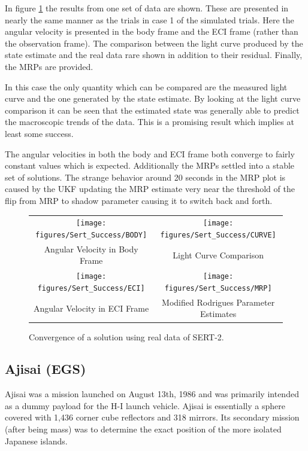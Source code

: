 In figure \ref{sert-2_results} the results from one set of data are shown. These are presented in nearly the same manner as the trials in case 1 of the simulated trials. Here the angular velocity is presented in the body frame and the ECI frame (rather than the observation frame). The comparison between the light curve produced by the state estimate and the real data rare shown in addition to their residual. Finally, the MRPs are provided.

In this case the only quantity which can be compared are the measured light curve and the one generated by the state estimate. By looking at the light curve comparison it can be seen that the estimated state was generally able to predict the macroscopic trends of the data. This is a promising result which implies at least some success.

The angular velocities in both the body and ECI frame both converge to fairly constant values which is expected. Additionally the MRPs settled into a stable set of solutions. The strange behavior around 20 seconds in the MRP plot is caused by the UKF updating the MRP estimate very near the threshold of the flip from MRP to shadow parameter causing it to switch back and forth.

\begin{figure}[H]
	\begin{tabular}{cc}
		\texttt{[image: figures/Sert\_Success/BODY]} &
		\texttt{[image: figures/Sert\_Success/CURVE]} \\
		Angular Velocity in Body Frame & Light Curve Comparison \\
		\texttt{[image: figures/Sert\_Success/ECI]} &
		\texttt{[image: figures/Sert\_Success/MRP]} \\
		Angular Velocity in ECI Frame & Modified Rodrigues Parameter Estimates
	\end{tabular}
	\caption{Convergence of a solution using real data of SERT-2.}
	\label{sert-2_results}
\end{figure}


\subsection{Ajisai (EGS)}

Ajisai was a mission launched on August 13th, 1986 and was primarily intended as a dummy payload for the H-I launch vehicle. \cite{ajisai_jaxa} Ajisai is essentially a sphere covered with 1,436 corner cube reflectors and 318 mirrors. \cite{ajisai} Its secondary mission (after being mass) was to determine the exact position of the more isolated Japanese islands. \cite{ajisai_jaxa}


